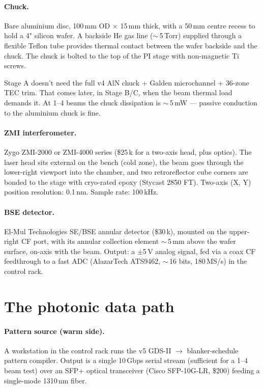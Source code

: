 \documentclass[11pt,letterpaper]{article}
\begin{document}
\paragraph{Chuck.} Bare aluminium disc, 100\,mm OD $\times$ 15\,mm thick, with a 50\,mm centre recess to hold a 4" silicon wafer. A backside He gas line ($\sim$\,5\,Torr) supplied through a flexible Teflon tube provides thermal contact between the wafer backside and the chuck. The chuck is bolted to the top of the PI stage with non-magnetic Ti screws.

Stage A doesn't need the full v4 AlN chuck + Galden microchannel + 36-zone TEC trim. That comes later, in Stage B/C, when the beam thermal load demands it. At 1--4 beams the chuck dissipation is $\sim$\,5\,mW --- passive conduction to the aluminium chuck is fine.

\paragraph{ZMI interferometer.} Zygo ZMI-2000 or ZMI-4000 series (\$25\,k for a two-axis head, plus optics). The laser head sits external on the bench (cold zone), the beam goes through the lower-right viewport into the chamber, and two retroreflector cube corners are bonded to the stage with cryo-rated epoxy (Stycast 2850 FT). Two-axis (X, Y) position resolution: 0.1\,nm. Sample rate: 100\,kHz.

\paragraph{BSE detector.} El-Mul Technologies SE/BSE annular detector (\$30\,k), mounted on the upper-right CF port, with its annular collection element $\sim$\,5\,mm above the wafer surface, on-axis with the beam. Output: a $\pm$5\,V analog signal, fed via a coax CF feedthrough to a fast ADC (AlazarTech ATS9462, $\sim$\,16 bits, 180\,MS/s) in the control rack.

\section{The photonic data path}
\label{sec:photonic}

\paragraph{Pattern source (warm side).} A workstation in the control rack runs the v5 GDS-II $\to$ blanker-schedule pattern compiler. Output is a single 10\,Gbps serial stream (sufficient for a 1--4 beam test) over an SFP+ optical transceiver (Cisco SFP-10G-LR, \$200) feeding a single-mode 1310\,nm fiber.
\end{document}
